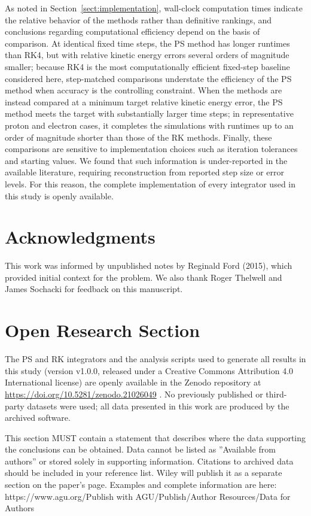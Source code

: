 \documentclass[draft]{agujournal2019}
\begin{document}
As noted in Section~\ref{sect:implementation}, wall-clock computation times indicate the relative behavior of the methods rather than definitive rankings, and conclusions regarding computational efficiency depend on the basis of comparison. At identical fixed time steps, the PS method has longer runtimes than RK4, but with relative kinetic energy errors several orders of magnitude smaller; because RK4 is the most computationally efficient fixed-step baseline considered here, step-matched comparisons understate the efficiency of the PS method when accuracy is the controlling constraint. When the methods are instead compared at a minimum target relative kinetic energy error, the PS method meets the target with substantially larger time steps; in representative proton and electron cases, it completes the simulations with runtimes up to an order of magnitude shorter than those of the RK methods. Finally, these comparisons are sensitive to implementation choices such as iteration tolerances and starting values. We found that such information is under-reported in the available literature, requiring reconstruction from reported step size or error levels. For this reason, the complete implementation of every integrator used in this study is openly available.

\section*{Acknowledgments}
This work was informed by unpublished notes by Reginald Ford (2015), which provided initial context for the problem. We also thank Roger Thelwell and James Sochacki for feedback on this manuscript.

\section*{Open Research Section}
The PS and RK integrators and the analysis scripts used to generate all results in this study (version v1.0.0, released under a Creative Commons Attribution 4.0 International license) are openly available in the Zenodo repository at \url{https://doi.org/10.5281/zenodo.21026049} \cite{Jiles_PS_code}. No previously published or third-party datasets were used; all data presented in this work are produced by the archived software.


This section MUST contain a statement that describes where the data supporting the conclusions can be obtained. Data cannot be listed as ''Available from authors'' or stored solely in supporting information. Citations to archived data should be included in your reference list. Wiley will publish it as a separate section on the paper’s page. Examples and complete information are here:
https://www.agu.org/Publish with AGU/Publish/Author Resources/Data for Authors
\end{document}
